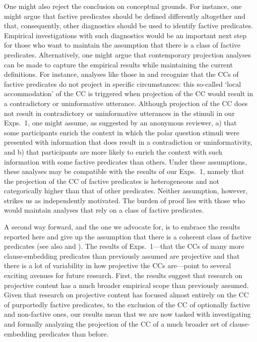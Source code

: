 \documentclass[11pt,fleqn]{article}
\newcommand{\6}{\mbox{$[\hspace*{-.6mm}[$}}
\newcommand{\9}{\mbox{$]\hspace*{-.6mm}]$}}
\begin{document}
One might also reject the conclusion on conceptual grounds. For instance, one might argue that factive predicates should be defined differently altogether and that, consequently, other diagnostics should be used to identify factive predicates. Empirical investigations with such diagnostics would be an important next step for those who want to maintain the assumption that there is a class of factive predicates. Alternatively, one might argue that contemporary projection analyses can be made to capture the empirical results while maintaining the current definitions. For instance, analyses like those in \citealt{heim83} and \citealt{vds92} recognize that the CCs of factive predicates do not project in specific circumstances: this so-called `local accommodation' of the CC is triggered when projection of the CC would result in a contradictory or uninformative utterance. Although projection of the CC does not result in contradictory or uninformative utterances in the stimuli in our Exps.~1, one might assume, as suggested by an anonymous reviewer, a) that some participants enrich the context in which the polar question stimuli were presented with information that does result in a contradiction or uninformativity, and b) that participants are more likely to enrich the context with such information with some factive predicates than others. Under these assumptions, these analyses may be compatible with the results of our Exps.~1, namely that the projection of the CC of factive predicates is heterogeneous and not categorically higher than that of other predicates. Neither assumption, however, strikes us as independently motivated. The burden of proof lies with those who would maintain analyses that rely on a class of factive predicates. 

A second way forward, and the one we advocate for, is to embrace the results reported here and give up the assumption that there is a coherent class of factive predicates (see also \citealt{karttunen2016} and \citealt{djaerv-thesis}). The results of Exps.~1---that the CCs of many more clause-embedding predicates than previously assumed are projective and that there is a lot of variability in how projective the CCs are---point to several exciting avenues for future research. First, the results suggest that research on projective content has a much broader empirical scope than previously assumed. Given that research on projective content has focused almost entirely on the CC of purportedly factive predicates, to the exclusion of the CC of optionally factive and non-factive ones, our results mean that we are now tasked with investigating and formally analyzing the projection of the CC of a much broader set of clause-embedding predicates than before. 
\end{document}
